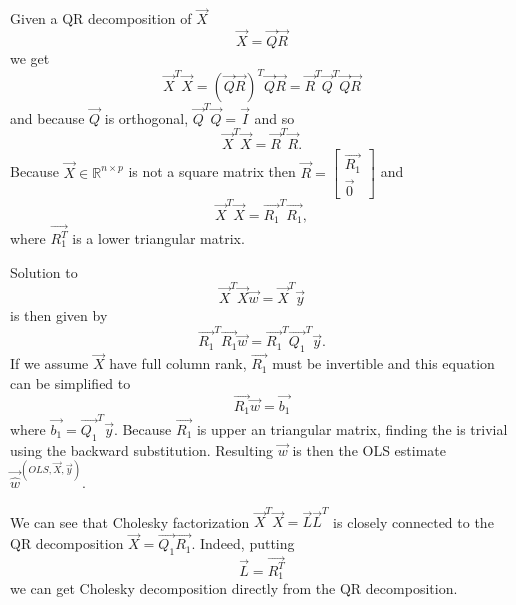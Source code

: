 Given a QR decomposition of $\vec{X}$
\begin{equation}
    \vec{X} = \vec{Q}\vec{R}
\end{equation}
we get
\begin{equation}
    \vec{X}^T\vec{X} = (\vec{Q}\vec{R})^T \vec{Q}\vec{R} = \vec{R}^T\vec{Q}^T\vec{Q}\vec{R}
\end{equation}
and because $\vec{Q}$ is orthogonal, $\vec{Q}^T\vec{Q} = \vec{I}$ and so
\begin{equation}
    \vec{X}^T\vec{X} = \vec{R}^T\vec{R}.
\end{equation}
Because $\vec{X} \in  \mathbb{R}^{n \times p}$ is not a square matrix then 
$
\vec{R} = 
\begin{bmatrix}
    \vec{R_1} \\
    \vec{0}
\end{bmatrix}
$
and
\begin{equation}
    \vec{X}^T\vec{X} = \vec{R_1}^T\vec{R_1},
\end{equation}
 where $\vec{R_1^T}$ is a lower triangular matrix. 

Solution to
\begin{equation}
    \vec{X}^T\vec{X}\vec{w} = \vec{X}^T\vec{y}
\end{equation}
is then given by 
\begin{equation}
    \vec{R_1}^T\vec{R_1}\vec{w} = \vec{R_1}^T\vec{Q_1}^T \vec{y}.
\end{equation}
If we assume $\vec{X}$ have full column rank, $\vec{R_1}$ must be invertible and this equation can be simplified to
\begin{equation}
    \vec{R_1}\vec{w} = \vec{b_1}
\end{equation}
where $ \vec{b_1} = \vec{Q_1}^T \vec{y}$. Because $\vec{R_1}$ is upper an triangular matrix, finding the is trivial using the backward substitution. Resulting $\vec{w}$ is then the OLS estimate $\vec{\hat{w}}^{(OLS,\vec{X}, \vec{y})}$.

\begin{note}
        We can see that Cholesky factorization  $\vec{X}^T\vec{X} = \vec{L}\vec{L}^T$ is closely connected to the QR decomposition $\vec{X} = \vec{Q_1}\vec{R_1}$. Indeed, putting   
        \begin{equation} \label{qrcholesky}
                \vec{L} = \vec{R_1^T}
            \end{equation}
        we can get Cholesky decomposition directly from the QR decomposition.
\end{note}

